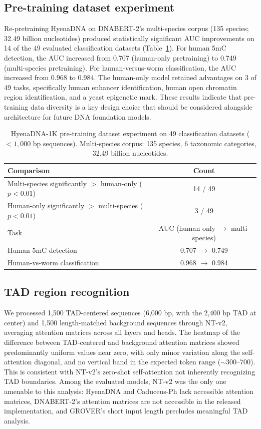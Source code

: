 \documentclass[11pt,a4paper]{article}
\begin{document}
\subsection{Pre-training dataset experiment}
Re-pretraining HyenaDNA on DNABERT-2's multi-species corpus (135 species; 32.49 billion nucleotides) produced statistically significant AUC improvements on 14 of the 49 evaluated classification datasets (Table~\ref{tab:pretrain}). For human 5mC detection, the AUC increased from 0.707 (human-only pretraining) to 0.749 (multi-species pretraining). For human-versus-worm classification, the AUC increased from 0.968 to 0.984. The human-only model retained advantages on 3 of 49 tasks, specifically human enhancer identification, human open chromatin region identification, and a yeast epigenetic mark. These results indicate that pre-training data diversity is a key design choice that should be considered alongside architecture for future DNA foundation models.

\begin{table}[t]
\centering
\caption{HyenaDNA-1K pre-training dataset experiment on 49 classification datasets ($<1{,}000$ bp sequences). Multi-species corpus: 135 species, 6 taxonomic categories, 32.49 billion nucleotides.}
\label{tab:pretrain}
\begin{tabular}{lc}
\toprule
Comparison & Count \\
\midrule
Multi-species significantly $>$ human-only ($p<0.01$)   & 14 / 49 \\
Human-only significantly $>$ multi-species ($p<0.01$)   & 3 / 49 \\
\midrule
Task & AUC (human-only $\rightarrow$ multi-species) \\
\midrule
Human 5mC detection                                     & 0.707 $\rightarrow$ 0.749 \\
Human-vs-worm classification                            & 0.968 $\rightarrow$ 0.984 \\
\bottomrule
\end{tabular}
\end{table}

\subsection{TAD region recognition}
We processed 1{,}500 TAD-centered sequences (6{,}000 bp, with the 2{,}400 bp TAD at center) and 1{,}500 length-matched background sequences through NT-v2, averaging attention matrices across all layers and heads. The heatmap of the difference between TAD-centered and background attention matrices showed predominantly uniform values near zero, with only minor variation along the self-attention diagonal, and no vertical band in the expected token range ($\sim$300--700). This is consistent with NT-v2's zero-shot self-attention not inherently recognizing TAD boundaries. Among the evaluated models, NT-v2 was the only one amenable to this analysis: HyenaDNA and Caduceus-Ph lack accessible attention matrices, DNABERT-2's attention matrices are not accessible in the released implementation, and GROVER's short input length precludes meaningful TAD analysis.
\end{document}
